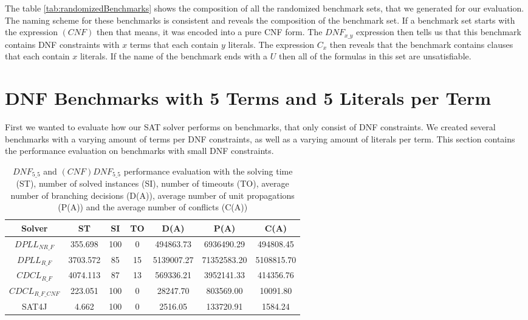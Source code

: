 The table \ref{tab:randomizedBenchmarks} shows the composition of all the randomized benchmark sets, that we generated for our evaluation. The naming scheme for these benchmarks is consistent and reveals the composition of the benchmark set. If a benchmark set starts with the expression $(CNF)$ then that means, it was encoded into a pure CNF form. The $DNF_{x\_y}$ expression then tells us that this benchmark contains DNF constraints with $x$ terms that each contain $y$ literals. The expression $C_x$ then reveals that the benchmark contains clauses that each contain $x$ literals. If the name of the benchmark ends with a $U$ then all of the formulas in this set are unsatisfiable.

\section{DNF Benchmarks with 5 Terms and 5 Literals per Term}

First we wanted to evaluate how our SAT solver performs on benchmarks, that only consist of DNF constraints. We created several benchmarks with a varying amount of terms per DNF constraints, as well as a varying amount of literals per term. This section contains the performance evaluation on benchmarks with small DNF constraints.

\begin{table}[!htb]
\centering
\caption[$DNF_{5\_5}$ and $(CNF)DNF_{5\_5}$ performance evaluation]{$DNF_{5\_5}$ and $(CNF)DNF_{5\_5}$ performance evaluation with the solving time (ST), number of solved instances (SI), number of timeouts (TO), average number of branching decisions (D(A)), average number of unit propagations (P(A)) and the average number of conflicts (C(A))}
\label{tab:dnf55Sat}
\begin{tabular}{|c|c|c|c|c|c|c|}
\hline
Solver & ST & SI & TO & D(A) & P(A) & C(A)\\ 
\hline
$DPLL_{NR\_F}$ & 355.698 & 100 & 0 & 494863.73 & 6936490.29 & 494808.45 \\ 
\hline
$DPLL_{R\_F}$ & 3703.572 & 85 & 15 & 5139007.27 & 71352583.20 & 5108815.70 \\ 
\hline
$CDCL_{R\_F}$ & 4074.113 & 87 & 13 & 569336.21 & 3952141.33 & 414356.76 \\ 
\hline
$CDCL_{R\_F\_CNF}$ & 223.051 & 100 & 0 & 28247.70 & 803569.00 & 10091.80 \\ 
\hline
SAT4J & 4.662 & 100 & 0 & 2516.05 & 133720.91 & 1584.24 \\ 
\hline
\end{tabular}
\end{table}

